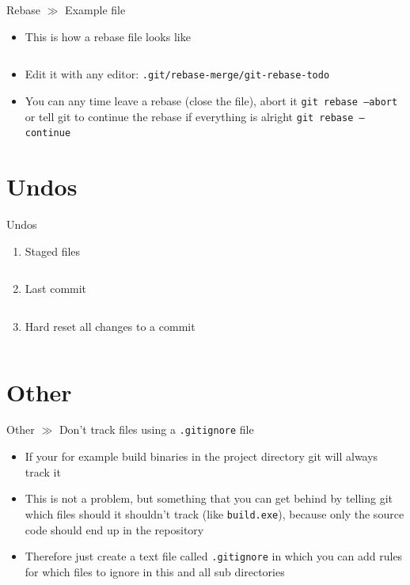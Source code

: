 \documentclass[10pt]{beamer}
\begin{document}
\begin{frame}{Rebase $\gg$ Example file}
\begin{center}
	\begin{itemize}
		\item This is how a rebase file looks like
		\inputminted[bgcolor=lightGreyCustom,fontsize=\scriptsize]{sh}{./resources/git_rebase_03_example}
		\item Edit it with any editor: \texttt{.git/rebase-merge/git-rebase-todo}
		\item You can any time leave a rebase (close the file), abort it \texttt{git rebase --abort} or tell git to continue the rebase if everything is alright \texttt{git rebase --continue}
	\end{itemize}
\end{center}
\end{frame}

\section{Undos}

\begin{frame}{Undos}
\begin{enumerate}
	\item Staged files
	\inputminted[bgcolor=lightGreyCustom,fontsize=\scriptsize]{sh}{./resources/git_undos_01_stage_files.sh}
	\item Last commit
	\inputminted[bgcolor=lightGreyCustom,fontsize=\scriptsize]{sh}{./resources/git_undos_02_last_commit.sh}
	\item  Hard reset all changes to a commit
	\inputminted[bgcolor=lightGreyCustom,fontsize=\scriptsize]{sh}{./resources/git_undos_03_hard_reset.sh}
\end{enumerate}
\end{frame}


\section{Other}

\begin{frame}{Other $\gg$ Don't track files using a \texttt{.gitignore} file}
\begin{itemize}
	\item If your for example build binaries in the project directory git will always track it
	\item This is not a problem, but something that you can get behind by telling git which files should it shouldn't track (like \texttt{build.exe}), because only the source code should end up in the repository
	\item Therefore just create a text file called \texttt{.gitignore} in which you can add rules for which files to ignore in this and all sub directories
	\inputminted[bgcolor=lightGreyCustom,fontsize=\scriptsize]{sh}{./resources/.gitignore}
\end{itemize}
\end{frame}
\end{document}
